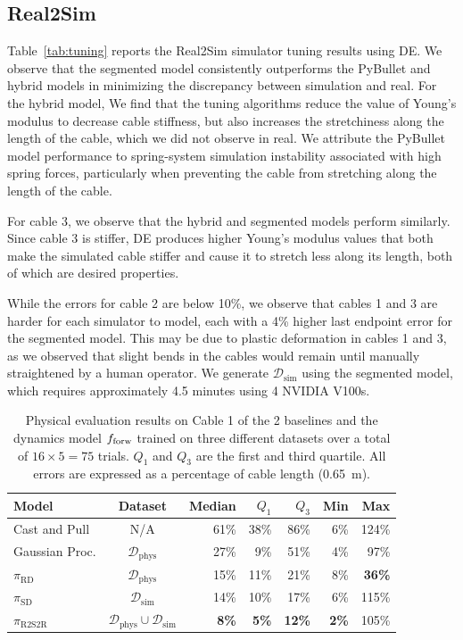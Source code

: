 \documentclass[letterpaper, 10pt, conference]{ieeeconf}  %
\newcommand{\dsim}{\mathcal{D}_\textrm{sim}}
\newcommand{\dreal}{\mathcal{D}_\textrm{phys}}
\newcommand{\pitune}{\pi_\textrm{R2S2R}}
\newcommand{\pisim}{\pi_\textrm{SD}}
\newcommand{\pireal}{\pi_\textrm{RD}}
\newcommand{\polarcasting}{Cast and Pull\xspace}
\begin{document}
\subsection{Real2Sim}\label{ssec:real2sim-results}
Table~\ref{tab:tuning} reports the Real2Sim simulator tuning results using DE. We observe that the segmented model consistently outperforms the PyBullet and hybrid models in minimizing the discrepancy between simulation and real. For the hybrid model, We find that the tuning algorithms reduce the value of Young's modulus to decrease cable stiffness, but also increases the stretchiness along the length of the cable, which we did not observe in real. We attribute the PyBullet model performance to spring-system simulation instability associated with high spring forces, particularly when preventing the cable from stretching along the length of the cable.

For cable 3, we observe that the hybrid and segmented models perform similarly. Since cable 3 is stiffer, DE produces higher Young's modulus values that both make the simulated cable stiffer and cause it to stretch less along its length, both of which are desired properties.

While the errors for cable 2 are below 10\%, we observe that cables 1 and 3 are harder for each simulator to model, each with a 4\% higher last endpoint error for the segmented model. This may be due to plastic deformation in cables 1 and 3, as we observed that slight bends in the cables would remain until manually straightened by a human operator. We generate $\dsim$ using the segmented model, which requires approximately 4.5 minutes using 4 NVIDIA V100s.

\begin{table}[t]
  \setlength\tabcolsep{5.0pt}
  \centering
  \vspace{1pt}
  \centering
  \scriptsize
  \begin{tabular}{@{}lcrrrrr@{}}
  \toprule
  Model & Dataset & Median & $Q_1$ & $Q_3$ & Min & Max \\
  \midrule
  \polarcasting & N/A & 61\% & 38\% & 86\% & 6\% & 124\%\\
  Gaussian Proc. & $\dreal$ & 27\%  & 9\%   & 51\% & 4\% & 97\%\\
  $\pireal$ & $\dreal$ & 15\% & 11\% & 21\% & 8\% & \textbf{36\%}\\
  $\pisim$ & $\dsim$ & 14\% & 10\% & 17\% & 6\%& 115\%\\
  $\pitune$ & $\dreal \cup \dsim$ & \textbf{8\%} &\textbf{5\%} & \textbf{12\%} & \textbf{2\%} & 105\% \\
  \toprule
  \end{tabular}
  

    \caption{
    Physical evaluation results on Cable 1 of the 2 baselines and the dynamics model $f_{\rm forw}$ trained on three different datasets over a total of $16\times5=75$ trials. $Q_1$ and $Q_3$ are the first and third quartile. All errors are expressed as a percentage of cable length (\SI{0.65}{\meter}).
  }
  \label{tab:error}
  \vspace*{-5pt}
\end{table}
\end{document}
